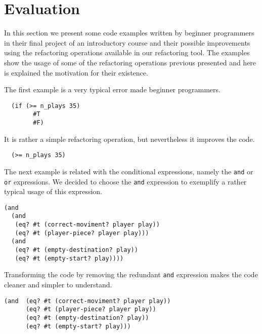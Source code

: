 

\section{Evaluation}
In this section we present some code examples written by beginner programmers
in their final project of an introductory course and their possible improvements
using the refactoring operations available in our refactoring tool.
The examples show the usage of some of the refactoring operations previous presented
and here is explained the motivation for their existence.

\lstset{style=racket}


The first example is a very typical error made beginner programmers.
\begin{lstlisting}
  (if (>= n_plays 35)
        #T
        #F)
\end{lstlisting}
It is rather a simple refactoring operation, but nevertheless it improves the code.
\begin{lstlisting}
  (>= n_plays 35)
\end{lstlisting}

The next example is related with the conditional expressions, namely the {\tt and}
or {\tt or} expressions. We decided to choose the {\tt and} expression to exemplify a
rather typical usage of this expression.
\begin{lstlisting}
(and
  (and
   (eq? #t (correct-moviment? player play))
   (eq? #t (player-piece? player play)))
  (and
   (eq? #t (empty-destination? play))
   (eq? #t (empty-start? play))))
\end{lstlisting}


Transforming the code by removing the redundant {\tt and} expression makes the code
cleaner and simpler to understand.
\begin{lstlisting}
(and  (eq? #t (correct-moviment? player play))
      (eq? #t (player-piece? player play))
      (eq? #t (empty-destination? play))
      (eq? #t (empty-start? play)))
\end{lstlisting}


